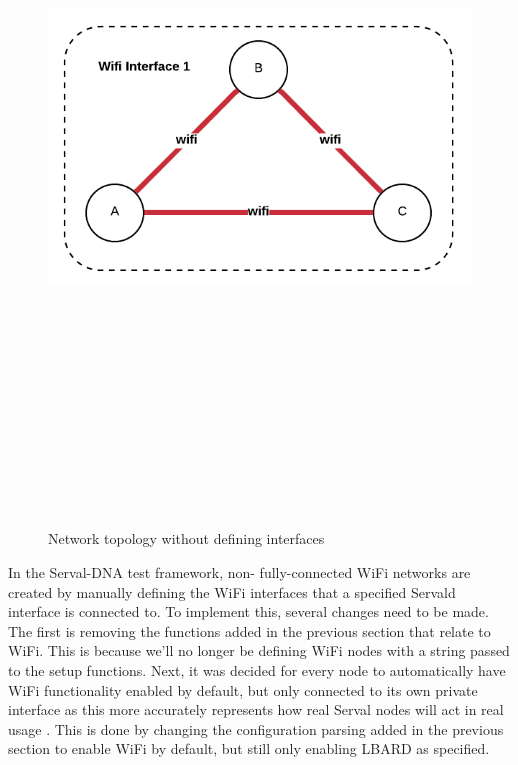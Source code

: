 \begin{figure}
    \begin{centering}
        \includegraphics[width=14cm,height=20cm,keepaspectratio]{Figures/networkWifiInterface1.png}
        \caption{Network topology without defining interfaces}
        \label{fig:networkWifi1}
    \end{centering}
\end{figure}


In the Serval-DNA test framework, non- fully-connected WiFi networks are created by manually defining the WiFi interfaces that a specified Servald interface is connected to.
To implement this, several changes need to be made.
The first is removing the functions added in the previous section that relate to WiFi.
This is because we'll no longer be defining WiFi nodes with a string passed to the setup functions.
Next, it was decided for every node to automatically have WiFi functionality enabled by default, but only connected to its own private interface as this more accurately represents how real Serval nodes will act in real usage .
This is done by changing the configuration parsing added in the previous section to enable WiFi by default, but still only enabling LBARD as specified.

